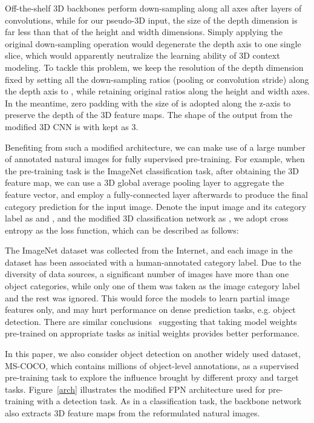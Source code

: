 \documentclass[journal,twoside,web]{ieeecolor}
\begin{document}
Off-the-shelf 3D backbones perform down-sampling along all  axes after layers of convolutions, while for our pseudo-3D input, the size of the depth dimension is far less than that of the height and width dimensions. Simply applying the original down-sampling operation would degenerate the depth axis to one single slice, which would apparently neutralize the learning ability of 3D context modeling. 
To tackle this problem, we keep the resolution of the depth dimension fixed by setting all the down-sampling ratios (pooling or convolution stride) along the depth axis to , while retaining original ratios along the height and width axes. In the meantime, zero padding with the size of  is adopted along the z-axis to preserve the depth of the 3D feature maps.
The shape of the output from the modified 3D CNN is  with  kept as 3.


Benefiting from such a modified architecture, we can make use of a large number of annotated natural images for fully supervised pre-training. For example, when the pre-training task is the ImageNet classification task, after obtaining the 3D feature map, we can use a 3D global average pooling layer to aggregate the feature vector, and employ a fully-connected layer afterwards to produce the final category prediction for the input image. Denote the input image and its category label as  and , and the modified 3D classification network as , we adopt cross entropy as the loss function, which can be described as follows:


The ImageNet dataset was collected from the Internet, and each image in the dataset has been associated with a human-annotated category label. Due to the diversity of data sources, a significant number of images have more than one object categories, while only one of them was taken as the image category label and the rest was ignored. This would force the models to learn partial image features only, and may hurt performance on dense prediction tasks, e.g. object detection. There are similar conclusions~\cite{majurski2019cell} suggesting that taking model weights pre-trained on appropriate tasks as initial weights provides better performance. 



In this paper, we also consider object detection on another widely used dataset, MS-COCO, which contains millions of object-level annotations, as a supervised pre-training task to explore the influence brought by different proxy and target tasks. Figure~\ref{arch} illustrates the modified FPN architecture used for pre-training with a detection task. As in a classification task, the backbone network also extracts 3D feature maps from the reformulated natural images. 
\end{document}

